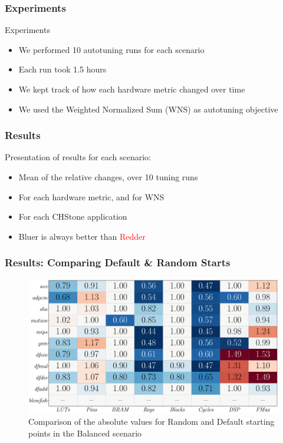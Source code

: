 \documentclass[10pt, compress, xcolor={table,xcdraw,usenames}, aspectratio=169]{beamer}
\begin{document}
\begin{frame}
    \frametitle{Experiments}
    \begin{block}{Experiments}
        \begin{itemize}
            \item We performed 10 \alert{autotuning runs for each scenario}
            \item Each run took \alert{1.5 hours}
            \item We kept track of \alert{how each hardware metric changed over
                time}
            \item We used the \alert{Weighted Normalized Sum} (\alert{WNS}) as
                \alert{autotuning objective}
        \end{itemize}
    \end{block}
\end{frame}

\begin{frame}
    \frametitle{Results}
    \begin{block}{Presentation of results for each scenario:}
        \begin{itemize}
            \item \alert{Mean of the relative changes}, over 10 tuning runs
            \item For each \alert{hardware metric}, and for \alert{WNS}
            \item For each \alert{CHStone application}
            \item \alert{Bluer} is always better than \textcolor{red}{Redder}
        \end{itemize}
    \end{block}
\end{frame}

\begin{frame}
    \frametitle{Results: Comparing Default \& Random Starts}
    \begin{figure}[htpb]
        \centering
        \includegraphics[width=0.8\columnwidth]{heatmap_comp_stratixV}
        \caption{Comparison of the absolute values for Random and Default
        starting points in the Balanced scenario}
    \end{figure}
\end{frame}
\end{document}
